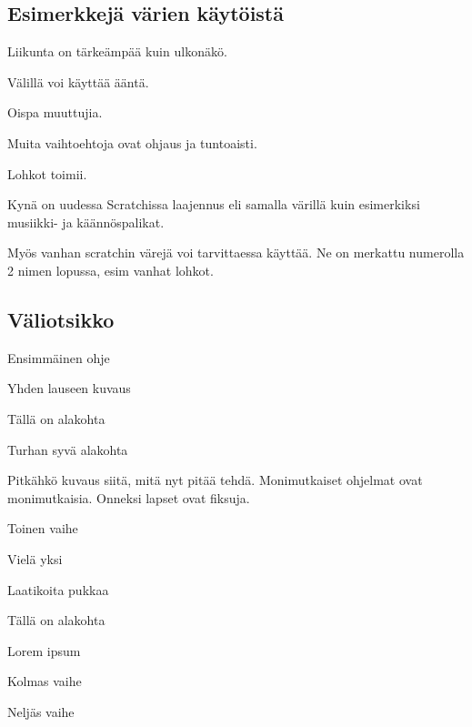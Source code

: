 \documentclass[12pt,twoside]{article}
\newenvironment{vaihetaso1}{%
    \LARGE
    \itemize
}{%
    \enditemize
}
\newenvironment{vaihetaso2}{%
    \Large
    \itemize
}{%
    \enditemize
}
\newenvironment{vaihetaso3}{%
    \large
    \itemize
}{%
    \enditemize
}
\begin{document}
\subsection*{Esimerkkejä värien käytöistä}
\begin{vaihetaso1}
	\item \textcolor{liike}{Liikunta} on tärkeämpää kuin \textcolor{ulkonako}{ulkonäkö}. 
	\begin{vaihetaso2}
		\item Välillä voi käyttää \textcolor{aani}{ääntä}.
		\item Oispa \textcolor{muuttujat}{muuttujia}.
		\begin{vaihetaso3}
			\item Muita vaihtoehtoja ovat \textcolor{ohjaus}{ohjaus} ja \textcolor{tuntoaisti}{tuntoaisti}.
		\end{vaihetaso3}
	\end{vaihetaso2}
	\item \textcolor{lohkot}{Lohkot} \textcolor{toiminnot}{toimii}.
	\item \textcolor{laajennus}{Kynä} on uudessa Scratchissa laajennus eli samalla värillä kuin esimerkiksi \textcolor{laajennus}{musiikki-} ja \textcolor{laajennus}{käännöspalikat}.
	\item Myös vanhan scratchin värejä voi tarvittaessa käyttää. Ne on merkattu numerolla 2 nimen lopussa, esim \textcolor{lohkot2}{vanhat lohkot}.
\end{vaihetaso1}

\subsection*{Väliotsikko}

\begin{vaihetaso1}
	\item Ensimmäinen ohje
	\begin{vaihetaso2}
		\item Yhden lauseen kuvaus
		\item Tällä on alakohta
		\begin{vaihetaso3}
			\item Turhan syvä alakohta
		\end{vaihetaso3}
		\item Pitkähkö kuvaus siitä, mitä nyt pitää tehdä. Monimutkaiset ohjelmat ovat monimutkaisia. Onneksi lapset ovat fiksuja.
	\end{vaihetaso2}
	\item Toinen vaihe
	\item Vielä yksi
	\begin{vaihetaso2}
		\item Laatikoita pukkaa
		\item Tällä on alakohta
		\item Lorem ipsum
	\end{vaihetaso2}
	\item Kolmas vaihe
	\item Neljäs vaihe
\end{vaihetaso1}
\end{document}
